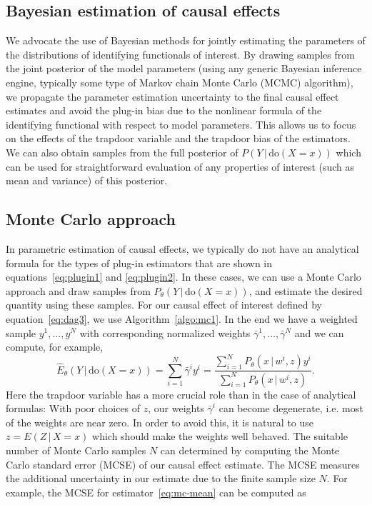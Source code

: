 \documentclass{statsoc}
\newcommand{\+}[1]{\ensuremath{\mathbf{#1}}}
\newcommand{\doo}{\textrm{do}}
\newcommand{\given}{{ \, | \, }}
\begin{document}
\subsection{Bayesian estimation of causal effects}

We advocate the use of Bayesian methods for jointly estimating the parameters of the distributions of identifying functionals of interest. By drawing samples from the joint posterior of the model parameters (using any generic Bayesian inference engine, typically some type of Markov chain Monte Carlo (MCMC) algorithm), we propagate the parameter estimation uncertainty to the final causal effect estimates and avoid the plug-in bias due to the nonlinear formula of the identifying functional with respect to model parameters. This allows us to focus on the effects of the trapdoor variable and the trapdoor bias of the estimators. We can also obtain samples from the full posterior of $P(Y \given \doo(X = x))$ which can be used for straightforward evaluation of any properties of interest (such as mean and variance) of this posterior. 

\subsection{Monte Carlo approach}
\label{sec:monte-carlo-approach}
In parametric estimation of causal effects, we typically do not have an analytical formula for the types of plug-in estimators that are shown in equations~\eqref{eq:plugin1} and \eqref{eq:plugin2}. In these cases, we can use a Monte Carlo approach and draw samples from $P_\theta(Y \given \doo(X = x))$, and estimate the desired quantity using these samples. For our causal effect of interest defined by equation~\eqref{eq:dag3}, we use Algorithm~\ref{algo:mc1}. In the end we have a weighted sample ${y^1,\ldots, y^N}$ with corresponding normalized weights ${\bar \gamma^1,\ldots, \bar \gamma^N}$ and we can compute, for example,
\begin{equation}
\label{eq:mc-mean}
\widehat E_\theta(Y \given \doo(X = x)) = \sum_{i=1}^N  \bar \gamma^i y^{i} = \frac{\sum_{i=1}^N P_\theta(x \given w^i,z)y^{i}}{\sum_{i=1}^N P_\theta(x \given w^i,z)}.
\end{equation}
Here the trapdoor variable has a more crucial role than in the case of analytical formulas: With poor choices of $z$, our weights $\bar \gamma^i$ can become degenerate, i.e. most of the weights are near zero. In order to avoid this, it is natural to use $z = E(Z\given X = x)$ which should make the weights well behaved. The suitable number of Monte Carlo samples $N$ can determined by computing the Monte Carlo standard error (MCSE) of our causal effect estimate. The MCSE measures the additional uncertainty in our estimate due to the finite sample size $N$. For example, the MCSE for estimator~\eqref{eq:mc-mean} can be computed as
\end{document}
